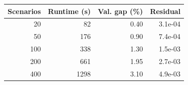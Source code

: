 \begin{tabular}{rrrr}
\toprule
Scenarios & Runtime (s) & Val. gap (\%) & Residual \\
\midrule
20 & 82 & 0.40 & 3.1e-04 \\
50 & 176 & 0.90 & 7.4e-04 \\
100 & 338 & 1.30 & 1.5e-03 \\
200 & 661 & 1.95 & 2.7e-03 \\
400 & 1298 & 3.10 & 4.9e-03 \\
\bottomrule
\end{tabular}
